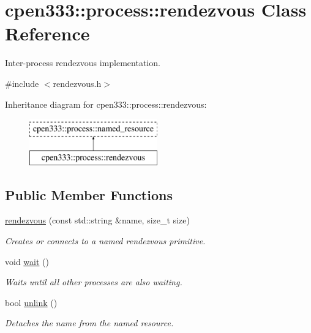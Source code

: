 \hypertarget{classcpen333_1_1process_1_1rendezvous}{}\section{cpen333\+:\+:process\+:\+:rendezvous Class Reference}
\label{classcpen333_1_1process_1_1rendezvous}


Inter-\/process rendezvous implementation.  




{\ttfamily \#include $<$rendezvous.\+h$>$}

Inheritance diagram for cpen333\+:\+:process\+:\+:rendezvous\+:\begin{figure}[H]
\begin{center}
\leavevmode
\includegraphics[height=2.000000cm]{classcpen333_1_1process_1_1rendezvous}
\end{center}
\end{figure}
\subsection*{Public Member Functions}
\begin{DoxyCompactItemize}
\item 
\hyperlink{classcpen333_1_1process_1_1rendezvous_a616069d02e03b2b33c7e10e730f084a0}{rendezvous} (const std\+::string \&name, size\+\_\+t size)
\begin{DoxyCompactList}\small\item\em Creates or connects to a named rendezvous primitive. \end{DoxyCompactList}\item 
void \hyperlink{classcpen333_1_1process_1_1rendezvous_a47603f8bc2aaf9302cb8132262912863}{wait} ()
\begin{DoxyCompactList}\small\item\em Waits until all other processes are also waiting. \end{DoxyCompactList}\item 
bool \hyperlink{classcpen333_1_1process_1_1rendezvous_a458242e8ba600b0e638421825cbc9589}{unlink} ()
\begin{DoxyCompactList}\small\item\em Detaches the name from the named resource. \end{DoxyCompactList}\end{DoxyCompactItemize}
